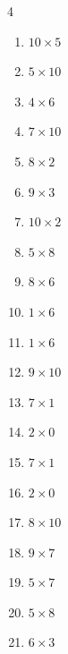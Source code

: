 \begin{multicols}{4}
\begin{enumerate}
  \item $10\times 5$
        \phantom{$=50$}

  \item $5\times 10$
        \phantom{$=50$}

  \item $4\times 6$
        \phantom{$=24$}

  \item $7\times 10$
        \phantom{$=70$}

  \item $8\times 2$
        \phantom{$=16$}

  \item $9\times 3$
        \phantom{$=27$}

  \item $10\times 2$
        \phantom{$=20$}

  \item $5\times 8$
        \phantom{$=40$}

  \item $8\times 6$
        \phantom{$=48$}

  \item $1\times 6$
        \phantom{$=6$}

  \item $1\times 6$
        \phantom{$=6$}

  \item $9\times 10$
        \phantom{$=90$}

  \item $7\times 1$
        \phantom{$=7$}

  \item $2\times 0$
        \phantom{$=0$}

  \item $7\times 1$
        \phantom{$=7$}

  \item $2\times 0$
        \phantom{$=0$}

  \item $8\times 10$
        \phantom{$=80$}

  \item $9\times 7$
        \phantom{$=63$}

  \item $5\times 7$
        \phantom{$=35$}

  \item $5\times 8$
        \phantom{$=40$}

  \item $6\times 3$
        \phantom{$=18$}


\end{enumerate}
\end{multicols}
